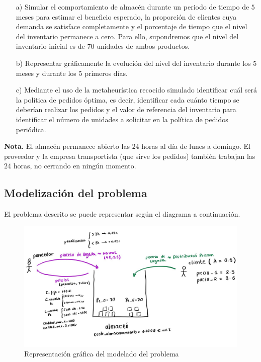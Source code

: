 \documentclass[a4paper,12pt]{article}
\begin{document}
	\begin{enumerate}
		\item[a)] Simular el comportamiento de almacén durante un periodo de tiempo de $5$ meses para estimar el beneficio esperado, la proporción de clientes cuya demanda se satisface completamente y el porcentaje de tiempo que el nivel del inventario permanece a cero. Para ello, supondremos que el nivel del inventario inicial es de $70$ unidades de ambos productos.

		\item[b)] Representar gráficamente la evolución del nivel del inventario durante los $5$ meses y durante los $5$ primeros días. 

		\item[c)] Mediante el uso de la metaheurística recocido simulado identificar cuál será la política de pedidos óptima, es decir, identificar cada cuánto tiempo se deberían realizar los pedidos y el valor de referencia del inventario para identificar el número de unidades a solicitar en la política de pedidos periódica.
	\end{enumerate}
	
	\textbf{Nota.} El almacén permanece abierto las $24$ horas al día de lunes a domingo. El proveedor y la empresa transportista (que sirve los pedidos) también trabajan las $24$ horas, no cerrando en ningún momento.

	\subsection{Modelización del problema}
	El problema descrito se puede representar según el diagrama a continuación.
	
	\begin{figure}[H]
		\centering
		\includegraphics[width=\textwidth]{include/modelo_almacen.png}
		\caption{Representación gráfica del modelado del problema}
	\end{figure}
	
\end{document}
